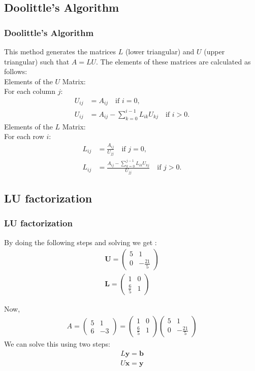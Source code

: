 \documentclass{beamer}
\theoremstyle{remark}
\newcommand{\myvec}[1]{\ensuremath{\begin{pmatrix}#1\end{pmatrix}}}
\let\vec\mathbf
\numberwithin{equation}{section}
\begin{document}
\subsection{Doolittle's Algorithm}
\begin{frame}
\frametitle{Doolittle's Algorithm}
This method generates the matrices \( L \) (lower triangular) and \( U \) (upper triangular) such that \( A = LU \). The elements of these matrices are calculated as follows: \\
Elements of the \( U \) Matrix:  \\
For each column \( j \):
\begin{align}
	U_{ij} &= A_{ij} \quad \text{if } i = 0, \\
	U_{ij} &= A_{ij} - \sum_{k=0}^{i-1} L_{ik} U_{kj} \quad \text{if } i > 0.
\end{align}
Elements of the \( L \) Matrix: \\
For each row \( i \):
\begin{align}
	L_{ij} &= \frac{A_{ij}}{U_{jj}} \quad \text{if } j = 0, \\
	L_{ij} &= \frac{A_{ij} - \sum_{k=0}^{j-1} L_{ik} U_{kj}}{U_{jj}} \quad \text{if } j > 0.
\end{align}
\end{frame}
\subsection{LU factorization}
\begin{frame}
\frametitle{LU factorization}
By doing the following steps and solving we get :
\begin{align}
	\vec{U}=\myvec{5 & 1\\0 & -\frac{21}{5}} \\
	\vec{ L} = \myvec{1 & 0\\\frac{6}{5} & 1}
\end{align}

Now,
\begin{align}
    A = \myvec{5 & 1\\6 & -3} = \myvec{1 & 0\\\frac{6}{5} & 1}\myvec{5 & 1\\0 & -\frac{21}{5}}
\end{align}
We can solve this using two steps:
\begin{align}
    L\vec{y} = \vec{b}\\
    U\vec{x} = \vec{y}
\end{align}
\end{frame}
\end{document}

